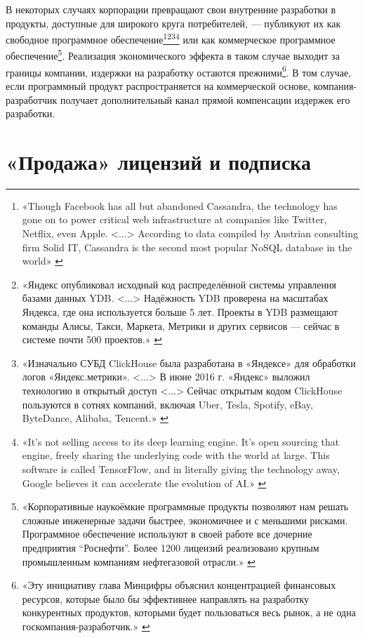 \documentclass{article}
\begin{document}
В некоторых случаях корпорации превращают свои внутренние разработки в продукты, доступные для широкого круга потребителей, — публикуют их как свободное программное обеспечение\footnote{«Though Facebook has all but abandoned Cassandra, the technology has gone on to power critical web infrastructure at companies like Twitter, Netflix, even Apple. <...> According to data compiled by Austrian consulting firm Solid IT, Cassandra is the second most popular NoSQL database in the world» \cite{facebookCassandra}}\footnote{«Яндекс опубликовал исходный код распределённой системы управления базами данных YDB. <...> Надёжность YDB проверена на масштабах Яндекса, где она используется больше 5 лет. Проекты в YDB размещают команды Алисы, Такси, Маркета, Метрики и других сервисов — сейчас в системе почти 500 проектов.» \cite{yandexYDB}}\footnote{«Изначально СУБД ClickHouse была разработана в «Яндексе» для обработки логов «Яндекс.метрики». <...> В июне 2016 г. «Яндекс» выложил технологию в открытый доступ <...> Сейчас открытым кодом ClickHouse пользуются в сотнях компаний, включая Uber, Tesla, Spotify, eBay, ByteDance, Alibaba, Tencent.» \cite{yandexClickHouse}}\footnote{«It's not selling access to its deep learning engine. It's open sourcing that engine, freely sharing the underlying code with the world at large. This software is called TensorFlow, and in literally giving the technology away, Google believes it can accelerate the evolution of AI.» \cite{googleTensorFlow}} или как коммерческое программное обеспечение\footnote{«Корпоративные наукоёмкие программные продукты позволяют нам решать сложные инженерные задачи быстрее, экономичнее и с меньшими рисками. Программное обеспечение используют в своей работе все дочерние предприятия “Роснефти”. Более 1200 лицензий реализовано крупным промышленным компаниям нефтегазовой отрасли.» \cite{rosneftSoft}}. Реализация экономического эффекта в таком случае выходит за границы компании, издержки на разработку остаются прежними\footnote{«Эту инициативу глава Минцифры объяснил концентрацией финансовых ресурсов, которые было бы эффективнее направлять на разработку конкурентных продуктов, которыми будет пользоваться весь рынок, а не одна госкомпания-разработчик.» \cite{mintcifriForbidInhouseSoft}}. В том случае, если программный продукт распространяется на коммерческой основе, компания-разработчик получает дополнительный канал прямой компенсации издержек его разработки.

\section*{«Продажа» лицензий и подписка}
\end{document}
